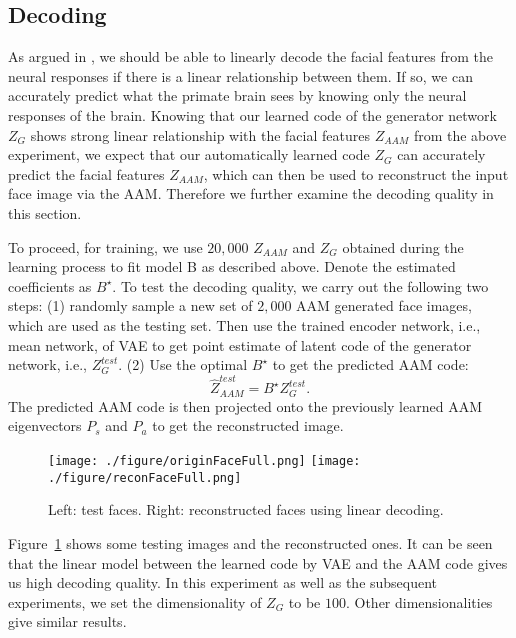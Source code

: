 \documentclass{article}
\begin{document}
\subsection{Decoding}
As argued in \cite{chang2017code}, we should be able to linearly decode the facial features from the neural responses if there is a linear relationship between them. If so, we can accurately predict what the primate brain sees by knowing only the neural responses of the brain. Knowing that our learned code of the generator network $Z_{G}$ shows strong linear relationship with the facial features $Z_{AAM}$ from the above experiment, we expect that our automatically learned code $Z_G$ can accurately predict the facial features $Z_{AAM}$, which can then be used to reconstruct the input face image via the AAM. Therefore we further examine the decoding quality in this section.

To proceed, for training, we use $20,000$ $Z_{AAM}$ and $Z_{G}$ obtained during  the learning process to fit model B as described above. Denote the estimated coefficients as $B^\star$. To test the decoding quality, we carry out the following two steps: (1) randomly sample a new set of $2,000$ AAM generated face images, which are used as the testing set. Then use the trained encoder network, i.e., mean network, of VAE to get point estimate of latent code of the generator network, i.e., $Z^{test}_{G}$. (2) Use the optimal $B^\star$ to get the predicted AAM code:
\begin{equation}
\hat{Z}^{test}_{AAM} = B^\star Z^{test}_{G}.
\end{equation}
The predicted AAM code is then projected onto the previously  learned AAM eigenvectors $P_s$ and $P_a$ to get the reconstructed image.

\begin{figure}[h]
	\begin{center}
		\texttt{[image: ./figure/originFaceFull.png]}\hspace{0.5mm}
		\texttt{[image: ./figure/reconFaceFull.png]}
		\caption{Left: test faces. Right: reconstructed faces using linear decoding.}
		\label{fig:AAM}
	\end{center}
\end{figure}

Figure~\ref{fig:AAM} shows some testing images and  the reconstructed ones. It can be seen that the linear model between the learned code by VAE and the AAM code  gives us high decoding quality. In this experiment as well as the subsequent experiments, we set the dimensionality of $Z_G$ to be $100$. Other dimensionalities give similar results.
\end{document}
